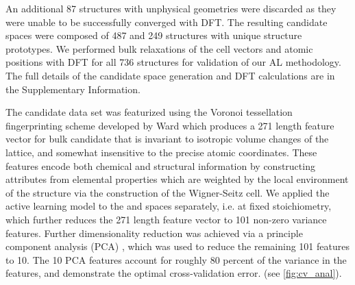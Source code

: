 %
An additional 87 structures with unphysical geometries were discarded as they were unable to be successfully converged with DFT.
%
%
%
The resulting candidate spaces were composed of \num{487} \IrOtwo and \num{249} \IrOthree structures with unique structure prototypes.
%
We performed bulk relaxations of the cell vectors and atomic positions with DFT for all \num{736} structures for validation of our AL methodology.
%
The full details of the candidate space generation and DFT calculations are in the Supplementary Information.
%
%


%
%
The candidate data set was featurized using the Voronoi tessellation fingerprinting scheme developed by Ward  \cite{Ward2017} which produces a \num{271} length feature vector for bulk candidate that is invariant to isotropic volume changes of the lattice, and somewhat insensitive to the precise atomic coordinates.
%
These features encode both chemical and structural information by constructing attributes from elemental properties which are weighted by the local environment of the structure via the construction of the Wigner-Seitz cell.
%
We applied the active learning model to the \IrOtwo and \IrOthree spaces separately, i.e. at fixed stoichiometry, which further reduces the \num{271} length feature vector to \num{101} non-zero variance features.
%
Further dimensionality reduction was achieved via a principle component analysis (PCA) \cite{Tipping1999}, which was used to reduce the remaining \num{101} features to \num{10}.
%
The \num{10} PCA features account for roughly 80 percent of the variance in the features, and demonstrate the optimal cross-validation error.
(see \ref{fig:cv_anal}).


